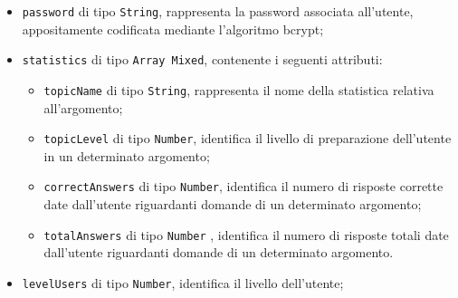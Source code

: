 \begin{itemize}
\begin{itemize}
\begin{itemize}
				\item
					\texttt{password} di tipo \texttt{String}, rappresenta la password associata all'utente,  appositamente codificata mediante l'algoritmo bcrypt;  		
				\item
					\texttt{statistics} di tipo \texttt{Array Mixed}, contenente i seguenti attributi:
				\begin{itemize}
					\item
						\texttt{topicName} di tipo \texttt{String}, rappresenta il nome della statistica relativa all'argomento;	 
					\item
						 \texttt{topicLevel} di tipo \texttt{Number}, identifica il livello di preparazione dell'utente in un determinato argomento;
					\item
						\texttt{correctAnswers} di tipo \texttt{Number}, identifica il numero di risposte corrette date dall'utente riguardanti domande di un determinato argomento; 
					\item						
						 \texttt{totalAnswers} di tipo \texttt{Number} , identifica il numero di risposte totali date dall'utente riguardanti domande di un determinato argomento.		
				\end{itemize}		
				\item 
					\texttt{levelUsers} di tipo \texttt{Number}, identifica il livello dell'utente;				
				

\end{itemize}
\end{itemize}
\end{itemize}
